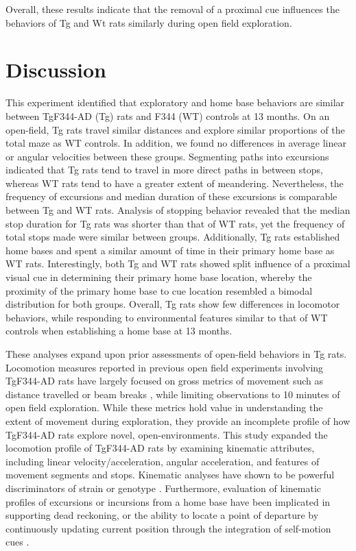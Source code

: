 \documentclass[fleqn,10pt]{wlscirep}
\begin{document}
Overall, these results indicate that the removal of a proximal cue influences the behaviors of Tg and Wt rats similarly during open field exploration. 

\section*{Discussion}

This experiment identified that exploratory and home base behaviors are similar between TgF344-AD (Tg) rats and F344 (WT) controls at 13 months. On an open-field, Tg rats travel similar distances and explore similar proportions of the total maze as WT controls. In addition, we found no differences in average linear or angular velocities between these groups. Segmenting paths into excursions indicated that Tg rats tend to travel in more direct paths in between stops, whereas WT rats tend to have a greater extent of meandering. Nevertheless, the frequency of excursions and median duration of these excursions is comparable between Tg and WT rats. Analysis of stopping behavior revealed that the median stop duration for Tg rats was shorter than that of WT rats, yet the frequency of total stops made were similar between groups. Additionally, Tg rats established home bases and spent a similar amount of time in their primary home base as WT rats. Interestingly, both Tg and WT rats showed split influence of a proximal visual cue in determining their primary home base location, whereby the proximity of the primary home base to cue location resembled a bimodal distribution for both groups. Overall, Tg rats show few differences in locomotor behaviors, while responding to environmental features similar to that of WT controls when establishing a home base at 13 months. 

These analyses expand upon prior assessments of open-field behaviors in Tg rats. Locomotion measures reported in previous open field experiments involving TgF344-AD rats have largely focused on gross metrics of movement such as distance travelled \cite{morrone_regional_2020,voorhees_occupational-like_2019,voorhees_-p7c3-s243_2018} or beam breaks \cite{cohen_transgenic_2013}, while limiting observations to 10 minutes of open field exploration. While these metrics hold value in understanding the extent of movement during exploration, they provide an incomplete profile of how TgF344-AD rats explore novel, open-environments. This study expanded the locomotion profile of TgF344-AD rats by examining kinematic attributes, including linear velocity/acceleration, angular acceleration, and features of movement segments and stops. Kinematic analyses have shown to be powerful discriminators of strain or genotype \cite{benjamini_ten_2010}. Furthermore, evaluation of kinematic profiles of excursions or incursions from a home base have been implicated in supporting dead reckoning, or the ability to locate a point of departure by continuously updating current position through the integration of self-motion cues \cite{wallace_fractionating_2008,wallace_movement_2006,wallace_quantification_2002}.
\end{document}
